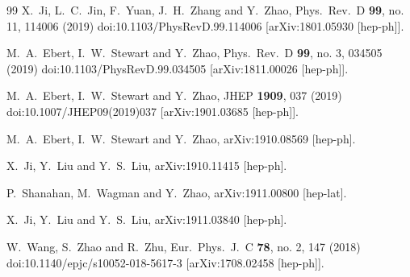 \begin{thebibliography}{99}
  X.~Ji, L.~C.~Jin, F.~Yuan, J.~H.~Zhang and Y.~Zhao,
  Phys.\ Rev.\ D {\bf 99}, no. 11, 114006 (2019)
  doi:10.1103/PhysRevD.99.114006
  [arXiv:1801.05930 [hep-ph]].
  
  M.~A.~Ebert, I.~W.~Stewart and Y.~Zhao,
  Phys.\ Rev.\ D {\bf 99}, no. 3, 034505 (2019)
  doi:10.1103/PhysRevD.99.034505
  [arXiv:1811.00026 [hep-ph]].
  
  M.~A.~Ebert, I.~W.~Stewart and Y.~Zhao,
  JHEP {\bf 1909}, 037 (2019)
  doi:10.1007/JHEP09(2019)037
  [arXiv:1901.03685 [hep-ph]].

  M.~A.~Ebert, I.~W.~Stewart and Y.~Zhao,
  arXiv:1910.08569 [hep-ph].
  
  X.~Ji, Y.~Liu and Y.~S.~Liu,
  arXiv:1910.11415 [hep-ph].
  
  P.~Shanahan, M.~Wagman and Y.~Zhao,
  arXiv:1911.00800 [hep-lat].
  
  X.~Ji, Y.~Liu and Y.~S.~Liu,
  arXiv:1911.03840 [hep-ph].


  W.~Wang, S.~Zhao and R.~Zhu,
  Eur.\ Phys.\ J.\ C {\bf 78}, no. 2, 147 (2018)
  doi:10.1140/epjc/s10052-018-5617-3
  [arXiv:1708.02458 [hep-ph]].



\end{thebibliography}
